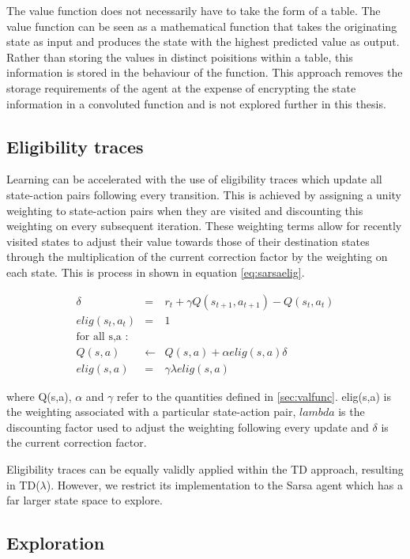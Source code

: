 \documentclass{rucsthesis}
\begin{document}
The value function does not necessarily have to take the form of a table. The value function can be seen as a mathematical function that takes the originating state as input and produces the state with the highest predicted value as output. Rather than storing the values in distinct poisitions within a table, this information is stored in the behaviour of the function. This approach removes the storage requirements of the agent at the expense of encrypting the state information in a convoluted function and is not explored further in this thesis.

\subsection{Eligibility traces}

Learning can be accelerated with the use of eligibility traces which update all state-action pairs following every transition.  This is achieved by assigning a unity weighting to state-action pairs when they are visited and discounting this weighting on every subsequent iteration. These weighting terms allow for recently visited states to adjust their value towards those of their destination states through the multiplication of the current correction factor by the weighting on each state. This is process in shown in equation \ref{eq:sarsaelig}.

\begin{eqnarray*}
\delta & = & r_{t} + \gamma Q(s_{t+1},a_{t+1}) - Q(s_t,a_t) \\
elig(s_t,a_t) & = & 1 \\
 \textrm{for all s,a : } & &  \\
Q(s,a) & \leftarrow & Q(s,a) + \alpha elig(s,a) \delta \label{eq:sarsaelig} \\
elig(s,a) & = & \gamma \lambda elig(s,a)
\end{eqnarray*}

where Q(s,a), $\alpha$ and $\gamma$ refer to the quantities defined in \ref{sec:valfunc}.
elig(s,a) is the weighting associated with a particular state-action pair, $lambda$ is the discounting factor used to adjust the weighting following every update and $\delta$ is the current correction factor.

Eligibility traces can be equally validly applied within the TD approach, resulting in TD($\lambda$). However, we restrict its implementation to the Sarsa agent which has a far larger state space to explore.

\subsection{Exploration}
\end{document}

